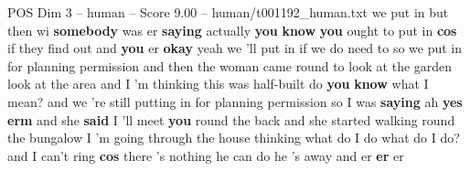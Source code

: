 \begin{textsample}{POS Dim 3 – human – Score 9.00 – human/t001192\_human.txt}  \label{ex:f3_pos_002}
we put in but then wi \textbf{somebody} was er \textbf{saying} actually \textbf{you} \textbf{know} \textbf{you} ought to put in \textbf{cos} if they find out and \textbf{you} er \textbf{okay} yeah we 'll put in if we do need to so we put in for planning permission and then the woman came round to look at the garden look at the area and I 'm thinking this was half-built do \textbf{you} \textbf{know} what I mean? and we 're still putting in for planning permission so I was \textbf{saying} ah \textbf{yes} \textbf{erm} and she \textbf{said} I 'll meet \textbf{you} round the back and she started walking round the bungalow I 'm going through the house thinking what do I do what do I do? and I can't ring \textbf{cos} there 's nothing he can do he 's away and er \textbf{er} er

\end{textsample}
